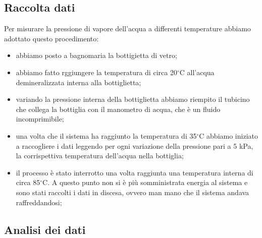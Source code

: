 \subsection{Raccolta dati}

Per misurare la pressione di vapore dell'acqua a differenti temperature abbiamo adottato questo procedimento:

\begin{itemize}
	\item{abbiamo posto a bagnomaria la bottigietta di vetro;}
	\item{abbiamo fatto rggiungere la temperatura di circa 20$^\circ$C all'acqua demineralizzata interna alla bottiglietta;}
	\item{variando la pressione interna della bottiglietta abbiamo riempito il
        tubicino che collega la bottiglia con il manometro di acqua, che è un fluido incomprimibile;}
	\item{una volta che il sistema ha raggiunto la temperatura di 35$^\circ$C abbiamo
        iniziato a raccogliere i dati leggendo per ogni variazione della pressione pari
        a 5 kPa, la corrispettiva temperatura dell'acqua nella bottiglia;}
	\item{il processo è stato interrotto una volta raggiunta una temperatura interna di
        circa 85$^\circ$C. A questo punto non si è più somministrata energia al sistema e sono
        stati raccolti i dati in discesa, ovvero man mano che il sistema andava raffreddandosi;}
\end{itemize}

\subsection{Analisi dei dati}

